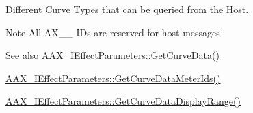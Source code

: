 Different Curve Types that can be queried from the Host. 

\begin{DoxyNote}{Note}
All \textquotesingle{}A\+X\+\_\+\+\_\+\textquotesingle{} I\+Ds are reserved for host messages
\end{DoxyNote}
\begin{DoxySeeAlso}{See also}
\hyperlink{a00342_gaa85bda4027342eb644a9c92a17da6d49}{A\+A\+X\+\_\+\+I\+Effect\+Parameters\+::\+Get\+Curve\+Data()} 

\hyperlink{a00342_gac7ba3c1063c35d761fdeba9c9a6cc0d1}{A\+A\+X\+\_\+\+I\+Effect\+Parameters\+::\+Get\+Curve\+Data\+Meter\+Ids()} 

\hyperlink{a00342_ga38d1ac0c15a7052904077ef0e2527e0d}{A\+A\+X\+\_\+\+I\+Effect\+Parameters\+::\+Get\+Curve\+Data\+Display\+Range()} 
\end{DoxySeeAlso}
